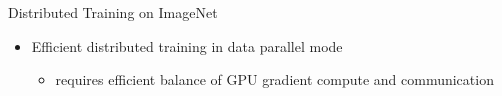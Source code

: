 \begin{frame}{Distributed Training on ImageNet}
\protect\hypertarget{distributed-training-on-imagenet-7}{}
\begin{itemize}
\tightlist
\item
  Efficient distributed training in data parallel mode

  \begin{itemize}
  \tightlist
  \item
    requires efficient balance of GPU gradient compute and communication
  \end{itemize}
\end{itemize}

\end{frame}

